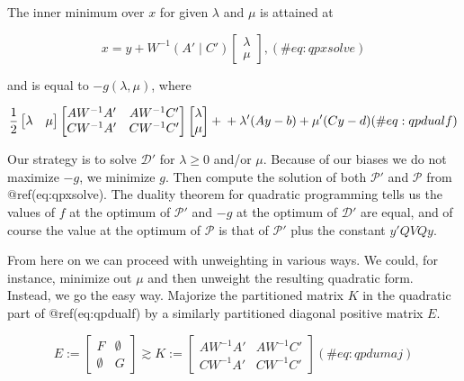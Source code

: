\documentclass[
  12pt,
  letterpaper,
  DIV=11,
  numbers=noendperiod]{scrreprt}
\theoremstyle{remark}
\begin{document}
The inner minimum over \(x\) for given \(\lambda\) and \(\mu\) is
attained at

\begin{equation}
x=y+W^{-1}(A'\mid C')\begin{bmatrix}\lambda\\\mu\end{bmatrix},
(\#eq:qpxsolve)
\end{equation}

and is equal to \(-g(\lambda,\mu)\), where

\begin{equation}
\frac12\begin{bmatrix}\lambda&\mu\end{bmatrix}
\begin{bmatrix}AW^{-1}A'&AW^{-1}C'\\CW^{-1}A'&CW^{-1}C'\end{bmatrix}\begin{bmatrix}\lambda\\\mu\end{bmatrix}+\\
+\lambda'(Ay-b)\\
+\mu'(Cy-d)
(\#eq:qpdualf)
\end{equation}

Our strategy is to solve \(\mathcal{D'}\) for \(\lambda\geq 0\) and/or
\(\mu\). Because of our biases we do not maximize \(-g\), we minimize
\(g\). Then compute the solution of both \(\mathcal{P}'\) and
\(\mathcal{P}\) from @ref(eq:qpxsolve). The duality theorem for
quadratic programming tells us the values of \(f\) at the optimum of
\(\mathcal{P}'\) and \(-g\) at the optimum of \(\mathcal{D}'\) are
equal, and of course the value at the optimum of \(\mathcal{P}\) is that
of \(\mathcal{P}'\) plus the constant \(y'QVQy\).

From here on we can proceed with unweighting in various ways. We could,
for instance, minimize out \(\mu\) and then unweight the resulting
quadratic form. Instead, we go the easy way. Majorize the partitioned
matrix \(K\) in the quadratic part of @ref(eq:qpdualf) by a similarly
partitioned diagonal positive matrix \(E\).

\begin{equation}
E:=\begin{bmatrix}F&\emptyset\\\emptyset&G\end{bmatrix}\gtrsim K:=\begin{bmatrix}AW^{-1}A'&AW^{-1}C'\\CW^{-1}A'&CW^{-1}C'\end{bmatrix}
(\#eq:qpdumaj)
\end{equation}
\end{document}
